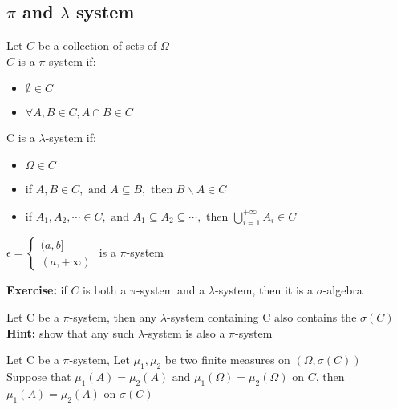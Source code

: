 \subsection{$ \pi $ and $\lambda  $ system  }
 \begin{definition}{}
 Let $ C $ be a collection of sets of $\Omega$\\
 $ C $ is a $ \pi $-system if:
 \begin{itemize}
 \item $ \emptyset\in C $
 \item $ \forall A,B\in C, A\cap B \in C $ 
 \end{itemize}
 C is a $ \lambda $-system if:
 \begin{itemize}
 \item $ \Omega\in C $
 \item if $  A,B\in C, \text{ and }A\subseteq B, \text{ then }B\backslash A \in C $
 \item if $ A_1,A_2,\cdots \in C, \text{ and }A_1\subseteq A_2\subseteq \cdots, \text{ then }\bigcup_{i=1}^{+\infty}A_i\in C $
 \end{itemize}
 \end{definition}
 \begin{example}[]{}
  $ \epsilon=\begin{cases}
    (a,b]\\
    (a,+\infty)
  \end{cases} $ is a $ \pi $-system 
 \end{example}
 \textbf{Exercise:}
 if $ C $ is both a $ \pi $-system and a $ \lambda $-system, then it is a $ \sigma $-algebra
 \begin{lemma}{}
 Let C be a $ \pi $-system, then any $ \lambda $-system containing C also contains the $\sigma(C)$
 \\\textbf{Hint:} show that any such  $\lambda$-system is also a $\pi$-system
 \end{lemma}
 \begin{theorem}{}
 Let C be a $ \pi $-system, Let $ \mu_1,\mu_2 $ be two finite measures on $ (\Omega,\sigma(C)) $\\
 Suppose that $ \mu_1(A)=\mu_2(A) \text{ and }\mu_1(\Omega)=\mu_2(\Omega)$ on $ C $, then $ \mu_1(A)=\mu_2(A) $ on $\sigma(C) $
 \end{theorem}
